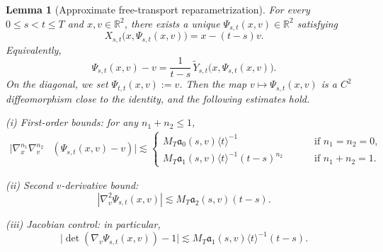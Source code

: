 \documentclass[reqno,11pt]{amsart}
\numberwithin{equation}{section}
\newtheorem{lemma}[theorem]{Lemma}
\begin{document}
	\begin{lemma}[Approximate free-transport reparametrization]\label{lem:Psi}
		For every $0\leq s<t\leq T$ and $x,v\in\mathbb{R}^2$, there exists a unique
		$\Psi_{s,t}(x,v)\in\mathbb{R}^2$ satisfying
		\begin{equation}\label{X(x,Psi)-new}
			X_{s,t}\!\big(x,\Psi_{s,t}(x,v)\big)=x-(t-s)v.
		\end{equation}
		Equivalently,
		\begin{equation}\label{z16a-new}
			\Psi_{s,t}(x,v)-v
			=
			\frac{1}{t-s}\,\widetilde{Y}_{s,t}\!\big(x,\Psi_{s,t}(x,v)\big).
		\end{equation}
		On the diagonal, we set $\Psi_{t,t}(x,v):=v$.
		Then the map $v\mapsto \Psi_{s,t}(x,v)$ is a $C^2$ diffeomorphism close to the identity, and the following estimates hold.
		
		(i) First-order bounds: for any $n_1+n_2\le 1$,
		\begin{align}\label{z52-new}
			|\nabla_x^{n_1}\nabla_v^{n_2}&(\Psi_{s,t}(x,v)-v)|\lesssim
			\begin{cases}
			M_T\mathfrak{a}_0(s,v)\langle t\rangle^{-1}\qquad&\text{ if }n_1=n_2=0,\\
			M_T\mathfrak{a}_1(s,v)\langle t\rangle^{-1}(t-s)^{n_2}\qquad&\text{ if }n_1+n_2=1.
			\end{cases}
		\end{align}

		(ii) Second $v$-derivative bound:
		\begin{equation}\label{q9-new}
			|\nabla_v^2\Psi_{s,t}(x,v)|\lesssim M_T\mathfrak{a}_2(s,v)(t-s).
		\end{equation}

		(iii) Jacobian control: in particular,
		\begin{equation}\label{z142c-new}
			\big|\det(\nabla_v\Psi_{s,t}(x,v))-1\big|\lesssim
			M_T\mathfrak{a}_1(s,v)\langle t\rangle^{-1}(t-s).
		\end{equation}
	\end{lemma}
	
\end{document}
